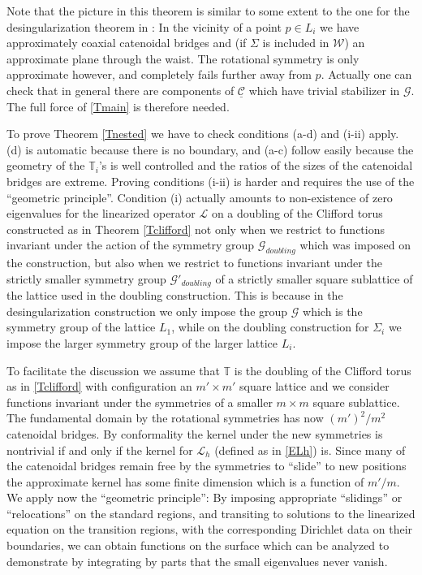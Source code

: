 \documentclass[12pt,namelimits,sumlimits]{amsart}
\theoremstyle{remark}
\numberwithin{equation}{section}
\begin{document}
Note that the picture in this theorem is similar to some extent to the one for the
desingularization theorem in \cite{kapouleas:finite}:
In the vicinity of a point $p\in L_i$ we have approximately coaxial catenoidal bridges 
and (if $\Sigma$ is included in ${{\mathcal{W}}}$) an approximate plane through the waist.
The rotational symmetry is only approximate however, and completely fails further away from $p$.
Actually one can check that in general there are components of ${\underline{{\mathcal{C}}}}$
which have trivial stabilizer in ${{\mathscr{G}}}$.
The full force of \ref{Tmain} is therefore needed.

To prove Theorem \ref{Tnested} we have to check conditions (a-d) and (i-ii) apply.
(d) is automatic because there is no boundary,
and (a-c) follow easily because the geometry of the ${\mathbb{T}}_i$'s
is well controlled and the ratios of the sizes of the catenoidal bridges are extreme.
Proving conditions (i-ii) is harder and requires the use of the ``geometric principle''.
Condition (i) actually
amounts to non-existence of 
zero eigenvalues for the linearized
operator ${\ensuremath{\mathcal L}}$ on a doubling of the Clifford torus constructed as in Theorem \ref{Tclifford}
not only when we restrict to functions invariant under the action of the symmetry group ${{\mathscr{G}}}_{doubling}$
which was imposed on the construction,
but also when we restrict to functions 
invariant under the strictly smaller
symmetry group ${{\mathscr{G}}}'_{doubling}$ of a strictly smaller square sublattice of the lattice used in the doubling
construction.
This is because in the desingularization construction we only impose the group ${{\mathscr{G}}}$ which
is the symmetry group of the lattice $L_1$,
while on the doubling construction for $\Sigma_i$ we impose the larger symmetry group of the larger lattice $L_i$.

To facilitate the discussion we assume that ${\mathbb{T}}$ is the doubling of the Clifford torus as in \ref{Tclifford}
with configuration an $m'\times m'$ square lattice and we consider functions invariant under the symmetries of a smaller
$m \times m$ square sublattice.
The fundamental domain by the rotational symmetries has now $(m')^2/m^2$ catenoidal bridges.
By conformality the kernel under the new symmetries is nontrivial
if and only if the kernel for ${\ensuremath{\mathcal L_h}}$ (defined as in \ref{ELh}) is.
Since many of the catenoidal bridges remain free by the symmetries to ``slide'' to new positions
the approximate kernel has some finite dimension which is a function of $m'/m$.
We apply now the ``geometric principle'':
By imposing appropriate ``slidings'' or ``relocations'' on the standard regions,
and transiting to solutions to the linearized equation on the transition regions,
with the corresponding Dirichlet data on their boundaries,
we can obtain functions on the surface which can be analyzed to demonstrate
by integrating by parts that the small eigenvalues never vanish.
\end{document}
